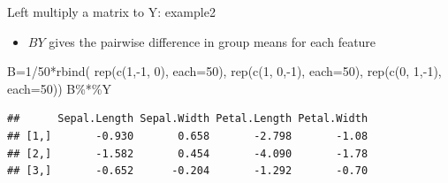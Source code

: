 \documentclass[
  ignorenonframetext,
]{beamer}
\newenvironment{Shaded}{\begin{snugshade}}{\end{snugshade}}
\newcommand{\AttributeTok}[1]{\textcolor[rgb]{0.77,0.63,0.00}{#1}}
\newcommand{\DecValTok}[1]{\textcolor[rgb]{0.00,0.00,0.81}{#1}}
\newcommand{\FunctionTok}[1]{\textcolor[rgb]{0.00,0.00,0.00}{#1}}
\newcommand{\NormalTok}[1]{#1}
\newcommand{\OtherTok}[1]{\textcolor[rgb]{0.56,0.35,0.01}{#1}}
\newcommand{\SpecialCharTok}[1]{\textcolor[rgb]{0.00,0.00,0.00}{#1}}
\providecommand{\tightlist}{%
  \setlength{\itemsep}{0pt}\setlength{\parskip}{0pt}}
\begin{document}
\begin{frame}[fragile]{Left multiply a matrix to Y: example2}
\protect\hypertarget{left-multiply-a-matrix-to-y-example2}{}
\begin{itemize}
\tightlist
\item
  \(BY\) gives the pairwise difference in group means for each feature
\end{itemize}

\begin{Shaded}
\begin{Highlighting}[]
\NormalTok{B}\OtherTok{=}\DecValTok{1}\SpecialCharTok{/}\DecValTok{50}\SpecialCharTok{*}\FunctionTok{rbind}\NormalTok{(}
  \FunctionTok{rep}\NormalTok{(}\FunctionTok{c}\NormalTok{(}\DecValTok{1}\NormalTok{,}\SpecialCharTok{{-}}\DecValTok{1}\NormalTok{, }\DecValTok{0}\NormalTok{), }\AttributeTok{each=}\DecValTok{50}\NormalTok{), }
  \FunctionTok{rep}\NormalTok{(}\FunctionTok{c}\NormalTok{(}\DecValTok{1}\NormalTok{, }\DecValTok{0}\NormalTok{,}\SpecialCharTok{{-}}\DecValTok{1}\NormalTok{), }\AttributeTok{each=}\DecValTok{50}\NormalTok{), }
  \FunctionTok{rep}\NormalTok{(}\FunctionTok{c}\NormalTok{(}\DecValTok{0}\NormalTok{, }\DecValTok{1}\NormalTok{,}\SpecialCharTok{{-}}\DecValTok{1}\NormalTok{), }\AttributeTok{each=}\DecValTok{50}\NormalTok{))}
\NormalTok{B}\SpecialCharTok{\%*\%}\NormalTok{Y}
\end{Highlighting}
\end{Shaded}

\begin{verbatim}
##      Sepal.Length Sepal.Width Petal.Length Petal.Width
## [1,]       -0.930       0.658       -2.798       -1.08
## [2,]       -1.582       0.454       -4.090       -1.78
## [3,]       -0.652      -0.204       -1.292       -0.70
\end{verbatim}
\end{frame}
\end{document}
